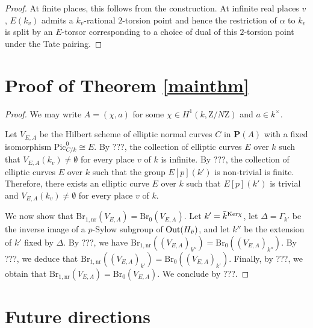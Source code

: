 \documentclass[10pt,letterpaper,twoside]{article}
\newcommand{\Z}{\mathrm{Z}}
\renewcommand{\1}{\mathbf{1}}
\newcommand{\bP}{\mathbf{P}}
\newcommand{\nr}{\mathrm{nr}}
\newcommand{\Pic}{\mathrm{Pic}}
\newcommand{\Br}{\mathrm{Br}}
\newcommand{\iso}{\cong}
\theoremstyle{plain}
\theoremstyle{plain}
\theoremstyle{definition}
\theoremstyle{named}
\theoremstyle{definition}
\begin{document}
	\begin{proof}
		At finite places, this follows from the construction. At infinite real places $v$, $E(k_v)$ admits a
		$k_v$-rational $2$-torsion point and hence the restriction of $\alpha$ to $k_v$ is split by an
		$E$-torsor corresponding to a choice of dual of this $2$-torsion point under the Tate pairing.
	\end{proof}
	
	
	
	\section{Proof of Theorem \ref{mainthm}}
	
	\begin{proof}
		We may write $A=(\chi,a)$ for some $\chi\in H^1(k,\Z/N\Z)$ and $a\in k^\times$. 
		
		Let $V_{E,A}$ be the Hilbert scheme of elliptic normal curves $C$ in $\bP(A)$ with a fixed isomorphism $\Pic_{C/k}^0\iso E$. By ???, the collection of elliptic curves $E$ over $k$ such that $V_{E,A}(k_v)\neq \emptyset$ for every place $v$ of $k$ is infinite. By ???, the collection of elliptic curves $E$ over $k$ such that the group $E[p](k')$ is non-trivial is finite. Therefore, there exists an elliptic curve $E$ over $k$ such that $E[p](k')$ is trivial and $V_{E,A}(k_v)\neq \emptyset$ for every place $v$ of $k$.
		
		We now show that $\Br_{1,\nr}(V_{E,A})=\Br_0(V_{E,A})$. Let $k'=\Bar{k}^{\mathrm{Ker}\chi}$, let $\Delta= \Gamma_{k'}$ be the inverse image of a $p$-Sylow subgroup of $\mathrm{Out}(H_{\Bar{v}})$, and let $k''$ be the extension of $k'$ fixed by $\Delta$. By ???, we have $\Br_{1,\nr}((V_{E,A})_{k''})=\Br_0((V_{E,A})_{k''})$. By ???, we deduce that $\Br_{1,\nr}((V_{E,A})_{k'})=\Br_0((V_{E,A})_{k'})$. Finally, by ???, we obtain that $\Br_{1,\nr}(V_{E,A})=\Br_0(V_{E,A})$. We conclude by ???.
	\end{proof}
	
	
	\section{Future directions}
	
\end{document}
